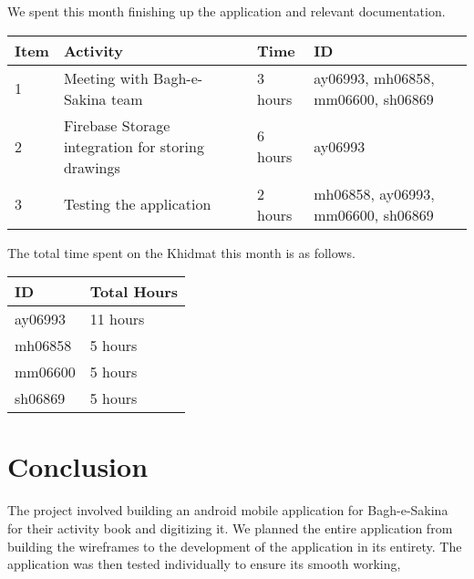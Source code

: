 \documentclass{article}
\begin{document}
We spent this month finishing up the application and relevant documentation.
\vspace{1em}

\noindent \begin{tabular}{|l|l|l|l|}
  \hline
  Item & Activity & Time & ID \\ \hline
  1 & Meeting with Bagh-e-Sakina team & 3 hours & ay06993, mh06858, mm06600, sh06869 \\ \hline
  2 & Firebase Storage integration for storing drawings & 6 hours & ay06993 \\ \hline
  3 & Testing the application & 2 hours & mh06858, ay06993, mm06600, sh06869 \\ \hline

\end{tabular}

\vspace{1em}

\noindent The total time spent on the Khidmat this month is as follows.

\vspace{1em}

\noindent \begin{tabular}{|l|l|}
  \hline
  ID & Total Hours \\\hline
  ay06993 & 11 hours \\ \hline
  mh06858 & 5 hours  \\ \hline
  mm06600 & 5 hours \\ \hline
  sh06869 & 5 hours \\ \hline
\end{tabular}

\newpage

\section*{Conclusion}

The project involved building an android mobile application for Bagh-e-Sakina for their activity book and digitizing it. We planned the entire application from building the wireframes to the development of the application in its entirety. The application was then tested individually to ensure its smooth working, 

\newpage
\thispagestyle{empty}
\end{document}
